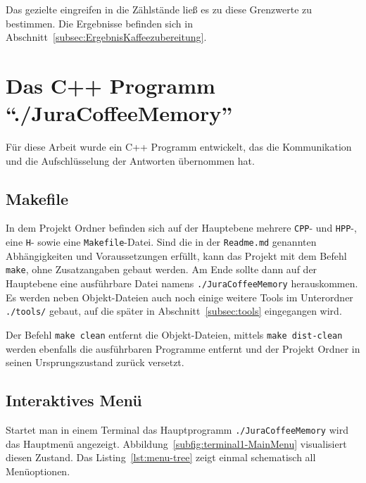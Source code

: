 Das gezielte eingreifen in die Zählstände ließ es zu diese Grenzwerte zu bestimmen.
Die Ergebnisse befinden sich in Abschnitt~\ref{subsec:ErgebnisKaffeezubereitung}.

\section{Das C++ Programm "`./JuraCoffeeMemory"'}
Für diese Arbeit wurde ein C++ Programm entwickelt, das die Kommunikation und die Aufschlüsselung der Antworten übernommen hat.

\subsection{Makefile}
In dem Projekt Ordner befinden sich auf der Hauptebene mehrere \texttt{CPP}- und \texttt{HPP}-, eine \texttt{H}- sowie eine \texttt{Makefile}-Datei.
Sind die in der \texttt{Readme.md} genannten Abhängigkeiten und Voraussetzungen erfüllt, kann das Projekt mit dem Befehl \texttt{make}, ohne Zusatzangaben gebaut werden.
Am Ende sollte dann auf der Hauptebene eine ausführbare Datei namens \texttt{./JuraCoffeeMemory} herauskommen.
Es werden neben Objekt-Dateien auch noch einige weitere Tools im Unterordner \texttt{./tools/} gebaut, auf die später in Abschnitt~\ref{subsec:tools} eingegangen wird.

Der Befehl \texttt{make clean} entfernt die Objekt-Dateien, mittels \texttt{make dist-clean} werden ebenfalls die ausführbaren Programme entfernt und der Projekt Ordner in seinen Ursprungszustand zurück versetzt.

\subsection{Interaktives Menü}
Startet man in einem Terminal das Hauptprogramm \texttt{./JuraCoffeeMemory} wird das Hauptmenü angezeigt. Abbildung~\ref{subfig:terminal1-MainMenu} visualisiert diesen Zustand.
Das Listing~\ref{lst:menu-tree} zeigt einmal schematisch all Menüoptionen.

